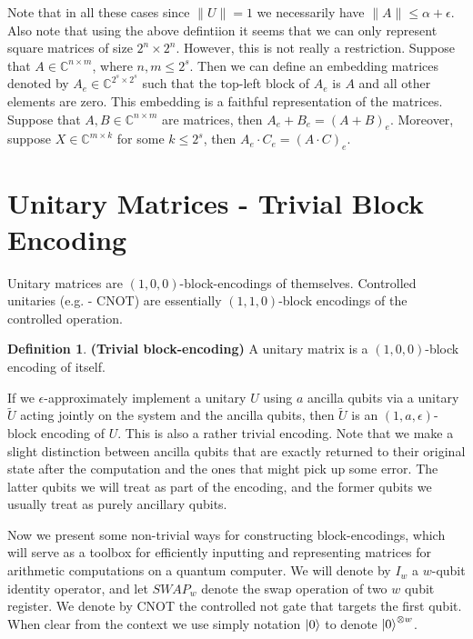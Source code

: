 \documentclass[12pt, oneside]{book}
\theoremstyle{definition}
\newtheorem{definition}{Definition}[section]
\theoremstyle{definition}
\theoremstyle{remark}
\begin{document}
Note that in all these cases since $\|U\|=1$ we necessarily have $\|A\|\leq \alpha+\epsilon$. Also note that using the above defintiion it seems that we can only represent square matrices of size $2^n \times 2^n$. However, this is not really a restriction. Suppose that $A\in\mathbb{C}^{n\times m}$, where $n,m\leq 2^s$. Then we can define an embedding matrices denoted by $A_e\in\mathbb{C}^{2^s\times 2^s}$ such that the top-left block of $A_e$ is $A$ and all other elements are zero. This embedding is a faithful representation of the matrices. Suppose that $A,B\in\mathbb{C}^{n\times m}$ are matrices, then $A_e+B_e=(A+B)_e$. Moreover, suppose $X\in\mathbb{C}^{m\times k}$ for some $k\leq 2^s$, then $A_e\cdot C_e=(A\cdot C)_e$.

\section{Unitary Matrices - Trivial Block Encoding}
Unitary matrices are $(1,0,0)$-block-encodings of themselves. Controlled unitaries (e.g. - CNOT) are essentially $(1,1,0)$-block encodings of the controlled operation.
\begin{definition}
    \textbf{(Trivial block-encoding)} A unitary matrix is a $(1,0,0)$-block encoding of itself.
\end{definition}

If we $\epsilon$-approximately implement a unitary $U$ using $a$ ancilla qubits via a unitary $\tilde{U}$ acting jointly on the system and the ancilla qubits, then $\tilde{U}$ is an $(1,a,\epsilon)$-block encoding of $U$. This is also a rather trivial encoding. Note that we make a slight distinction between ancilla qubits that are exactly returned to their original state after the computation and the ones that might pick up some error. The latter qubits we will treat as part of the encoding, and the former qubits we usually treat as purely ancillary qubits.

Now we present some non-trivial ways for constructing block-encodings, which will serve as a toolbox for efficiently inputting and representing matrices for arithmetic computations on a quantum computer. We will denote by $I_w$ a $w$-qubit identity operator, and let $SWAP_w$ denote the swap operation of two $w$ qubit register. We denote by CNOT the controlled not gate that targets the first qubit. When clear from the context we use simply notation $\ket{0}$ to denote $\ket{0}^{\otimes w}$.
\end{document}
